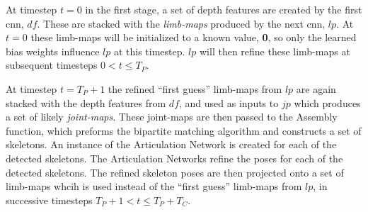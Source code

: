 At timestep $t = 0$ in the first stage, a set of depth features are created by the first \gls{cnn}, $df$. These are stacked with the \emph{limb-maps} produced by the next \gls{cnn}, $lp$. At $t = 0$ these limb-maps will be initialized to a known value, \textbf{0}, so only the learned bias weights influence $lp$ at this timestep. $lp$ will then refine these limb-maps at subsequent timesteps $0 < t \leq T_{P}$.

At timestep $t = T_{P} + 1$ the refined ``first guess'' limb-maps from $lp$ are again stacked with the depth features from $df$, and used as inputs to $jp$ which produces a set of likely \emph{joint-maps}. These joint-maps are then passed to the Assembly function, which preforms the bipartite matching algorithm and constructs a set of skeletons. An instance of the Articulation Network is created for each of the detected skeletons. The Articulation Networks refine the poses for each of the detected skeletons. The refined skeleton poses are then projected onto a set of limb-maps whcih is used instead of the ``first guess'' limb-maps from $lp$, in successive timesteps $T_{P} + 1 < t \leq T_{P} + T_{C}$.





